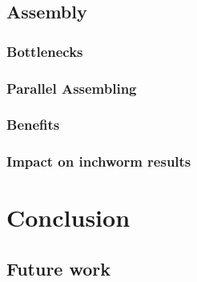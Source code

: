 \documentclass[plainarticle,zihtitle,english,final,hyperref,utf8]{zihpub}
\begin{document}
\subsection{Assembly}
\subsubsection{Bottlenecks}
\subsubsection{Parallel Assembling}
\subsubsection{Benefits}
\subsubsection{Impact on inchworm results}

\section{Conclusion}
\subsection{Future work}
\end{document}

